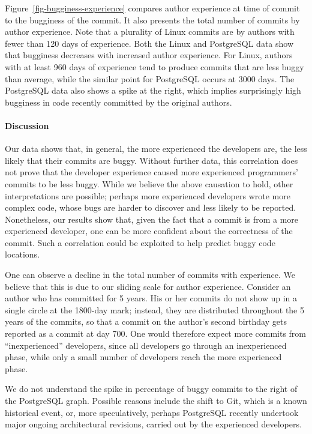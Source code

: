 Figure~\ref{fig-bugginess-experience} compares author experience at time of
commit to the bugginess of the commit. It also presents the total number of
commits by author experience. Note that a plurality of Linux commits are by
authors with fewer than 120 days of experience. Both the Linux and PostgreSQL
data show that bugginess decreases with increased author experience. For Linux,
authors with at least 960 days of experience tend to produce commits that are
less buggy than average, while the similar point for PostgreSQL occurs at 3000
days. The PostgreSQL data also shows a spike at the right, which implies
surprisingly high bugginess in code recently committed by the original authors.

\paragraph{Discussion}

Our data shows that, in general, the more experienced the developers are, the
less likely that their commits are buggy. Without further data, this
correlation does not prove that the developer experience caused more experienced
programmers' commits to be less buggy. While we believe the above causation to
hold, other interpretations are possible; perhaps more experienced developers
wrote more complex code, whose bugs are harder to discover and less likely to be
reported. Nonetheless, our results show that, given the fact that a commit is
from a more experienced developer, one can be more confident about the
correctness of the commit. Such a correlation could be exploited to help predict
buggy code locations.

One can observe a decline in the total number of commits with experience.
We believe that this is due to our sliding scale for author experience.
Consider an author who has committed for 5 years. His or her commits do not
show up in a single circle at the 1800-day mark; instead, they are distributed
throughout the 5 years of the commits, so that a commit on the author's second
birthday gets reported as a commit at day 700. One would therefore expect
more commits from ``inexperienced'' developers, since all developers go through
an inexperienced phase, while only a small number of developers reach the
more experienced phase.

We do not understand the spike in percentage of buggy commits to the
right of the PostgreSQL graph. Possible reasons include the shift to
Git, which is a known historical event, or, more speculatively,
perhaps PostgreSQL recently undertook major ongoing architectural
revisions, carried out by the experienced developers.

